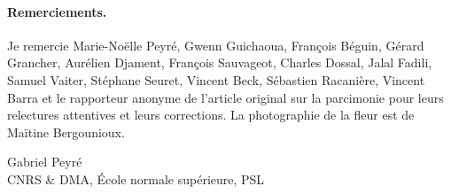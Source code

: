 \paragraph*{Remerciements.}
Je remercie Marie-Noëlle Peyré, Gwenn Guichaoua, François Béguin, Gérard Grancher, Aurélien Djament, François Sauvageot, Charles Dossal, Jalal Fadili, Samuel Vaiter, Stéphane Seuret, Vincent Beck, Sébastien Racanière, Vincent Barra et le rapporteur anonyme de l'article original sur la parcimonie pour leurs relectures attentives et leurs corrections. La photographie de la fleur est de Maïtine Bergounioux.

\medskip
\noindent Gabriel Peyré\\
CNRS \& DMA, École normale supérieure, PSL
